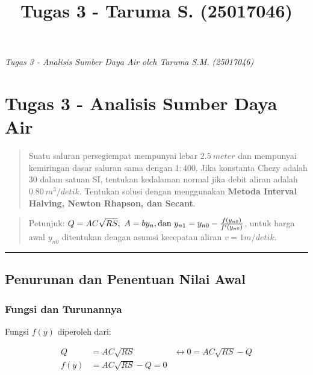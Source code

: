 \documentclass[10pt, a4paper]{article}
\title{Tugas 3 - Taruma S. (25017046)}
\begin{document}
    
    
    
    

    
    \emph{Tugas 3 - Analisis Sumber Daya Air oleh Taruma S.M. (25017046)}

\section{Tugas 3 - Analisis Sumber Daya
Air}\label{tugas-3---analisis-sumber-daya-air}

\begin{quote}
Suatu saluran persegiempat mempunyai lebar \(2.5\ meter\) dan mempunyai
kemiringan dasar saluran sama dengan \(1:400\). Jika konstanta Chezy
adalah 30 dalam satuan SI, tentukan kedalaman normal jika debit aliran
adalah \(0.80\ m^3/detik\). Tentukan solusi dengan menggunakan
\textbf{Metoda Interval Halving, Newton Rhapson, dan Secant}.
\end{quote}

\begin{quote}
Petunjuk:
\(Q = AC\sqrt{RS},\ A=by_n, \text{dan}\ \large{y_{n1} = y_{n0}-\frac{f(y_{n0})}{f'(y_{n0})}}\),
untuk harga awal \(y_{n0}\) ditentukan dengan asumsi kecepatan aliran
\(v = 1 m/detik\).
\end{quote}

    \begin{center}\rule{0.5\linewidth}{\linethickness}\end{center}

\subsection{Penurunan dan Penentuan Nilai
Awal}\label{penurunan-dan-penentuan-nilai-awal}

\subsubsection{Fungsi dan Turunannya}\label{fungsi-dan-turunannya}

Fungsi \(f(y)\) diperoleh dari:

\[\begin{aligned} 
Q &= A C \sqrt{R S} &\leftrightarrow 0 = A C \sqrt{R S} - Q \\
f(y) &= A C \sqrt{R S} - Q = 0 & 
\end{aligned}\]
\end{document}
